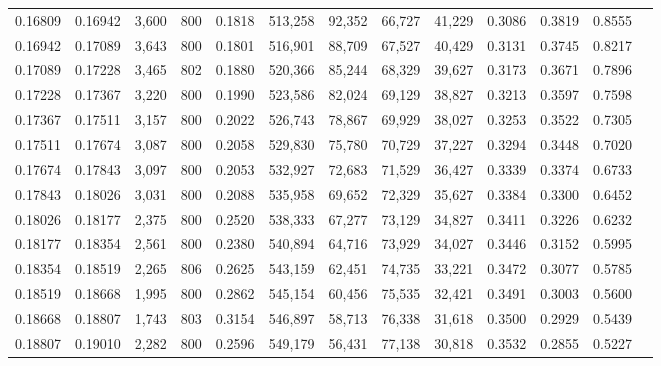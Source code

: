 \begin{tabular}{rrrrrrrrrrrrr}
0.16809 & 0.16942 &  3,600 &   800 &                                     0.1818 & 513,258 &  92,352 &  66,727 &  41,229 & 0.3086 & 0.3819 & 0.8555 \\
0.16942 & 0.17089 &  3,643 &   800 &                                     0.1801 & 516,901 &  88,709 &  67,527 &  40,429 & 0.3131 & 0.3745 & 0.8217 \\
0.17089 & 0.17228 &  3,465 &   802 &                                     0.1880 & 520,366 &  85,244 &  68,329 &  39,627 & 0.3173 & 0.3671 & 0.7896 \\
0.17228 & 0.17367 &  3,220 &   800 &                                     0.1990 & 523,586 &  82,024 &  69,129 &  38,827 & 0.3213 & 0.3597 & 0.7598 \\
0.17367 & 0.17511 &  3,157 &   800 &                                     0.2022 & 526,743 &  78,867 &  69,929 &  38,027 & 0.3253 & 0.3522 & 0.7305 \\
0.17511 & 0.17674 &  3,087 &   800 &                                     0.2058 & 529,830 &  75,780 &  70,729 &  37,227 & 0.3294 & 0.3448 & 0.7020 \\
0.17674 & 0.17843 &  3,097 &   800 &                                     0.2053 & 532,927 &  72,683 &  71,529 &  36,427 & 0.3339 & 0.3374 & 0.6733 \\
0.17843 & 0.18026 &  3,031 &   800 &                                     0.2088 & 535,958 &  69,652 &  72,329 &  35,627 & 0.3384 & 0.3300 & 0.6452 \\
0.18026 & 0.18177 &  2,375 &   800 &                                     0.2520 & 538,333 &  67,277 &  73,129 &  34,827 & 0.3411 & 0.3226 & 0.6232 \\
0.18177 & 0.18354 &  2,561 &   800 &                                     0.2380 & 540,894 &  64,716 &  73,929 &  34,027 & 0.3446 & 0.3152 & 0.5995 \\
0.18354 & 0.18519 &  2,265 &   806 &                                     0.2625 & 543,159 &  62,451 &  74,735 &  33,221 & 0.3472 & 0.3077 & 0.5785 \\
0.18519 & 0.18668 &  1,995 &   800 &                                     0.2862 & 545,154 &  60,456 &  75,535 &  32,421 & 0.3491 & 0.3003 & 0.5600 \\
0.18668 & 0.18807 &  1,743 &   803 &                                     0.3154 & 546,897 &  58,713 &  76,338 &  31,618 & 0.3500 & 0.2929 & 0.5439 \\
0.18807 & 0.19010 &  2,282 &   800 &                                     0.2596 & 549,179 &  56,431 &  77,138 &  30,818 & 0.3532 & 0.2855 & 0.5227 \\

\end{tabular}
